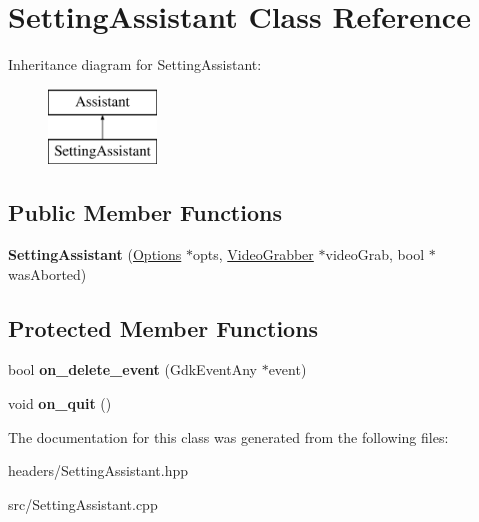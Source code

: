 \hypertarget{classSettingAssistant}{\section{Setting\-Assistant Class Reference}
\label{classSettingAssistant}
}
Inheritance diagram for Setting\-Assistant\-:\begin{figure}[H]
\begin{center}
\leavevmode
\includegraphics[height=2.000000cm]{classSettingAssistant}
\end{center}
\end{figure}
\subsection*{Public Member Functions}
\begin{DoxyCompactItemize}
\item 
\hypertarget{classSettingAssistant_a49c046dc76e8f275c482cab1c8cacb72}{{\bfseries Setting\-Assistant} (\hyperlink{structOptions}{Options} $\ast$opts, \hyperlink{classVideoGrabber}{Video\-Grabber} $\ast$video\-Grab, bool $\ast$was\-Aborted)}\label{classSettingAssistant_a49c046dc76e8f275c482cab1c8cacb72}

\end{DoxyCompactItemize}
\subsection*{Protected Member Functions}
\begin{DoxyCompactItemize}
\item 
\hypertarget{classSettingAssistant_a569252ccd0466898f7f58b4d801cbf98}{bool {\bfseries on\-\_\-delete\-\_\-event} (Gdk\-Event\-Any $\ast$event)}\label{classSettingAssistant_a569252ccd0466898f7f58b4d801cbf98}

\item 
\hypertarget{classSettingAssistant_ab72a75382318af97c2bc40e54398ad54}{void {\bfseries on\-\_\-quit} ()}\label{classSettingAssistant_ab72a75382318af97c2bc40e54398ad54}

\end{DoxyCompactItemize}


The documentation for this class was generated from the following files\-:\begin{DoxyCompactItemize}
\item 
headers/Setting\-Assistant.\-hpp\item 
src/Setting\-Assistant.\-cpp\end{DoxyCompactItemize}
